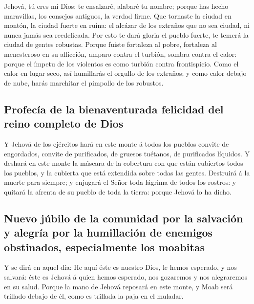  Jehová, tú eres mi Dios: te ensalzaré, alabaré tu nombre;
porque has hecho maravillas, los consejos antiguos, la verdad firme.
 Que tornaste la ciudad en montón, la ciudad fuerte en
ruina: el alcázar de los extraños que no sea ciudad, ni nunca jamás sea
reedeficada.  Por esto te dará gloria el pueblo fuerte, te
temerá la ciudad de gentes robustas.  Porque fuiste
fortaleza al pobre, fortaleza al menesteroso en su aflicción, amparo
contra el turbión, sombra contra el calor: porque el ímpetu de los
violentos es como turbión contra frontispicio.  Como el
calor en lugar seco, así humillarás el orgullo de los extraños; y como
calor debajo de nube, harás marchitar el pimpollo de los robustos.

\hypertarget{profecuxeda-de-la-bienaventurada-felicidad-del-reino-completo-de-dios}{%
\subsection{Profecía de la bienaventurada felicidad del reino completo
de
Dios}\label{profecuxeda-de-la-bienaventurada-felicidad-del-reino-completo-de-dios}}

 Y Jehová de los ejércitos hará en este monte á todos los
pueblos convite de engordados, convite de purificados, de gruesos
tuétanos, de purificados líquidos.  Y deshará en este
monte la máscara de la cobertura con que están cubiertos todos los
pueblos, y la cubierta que está extendida sobre todas las gentes.
 Destruirá á la muerte para siempre; y enjugará el Señor
toda lágrima de todos los rostros: y quitará la afrenta de su pueblo de
toda la tierra: porque Jehová lo ha dicho.

\hypertarget{nuevo-juxfabilo-de-la-comunidad-por-la-salvaciuxf3n-y-alegruxeda-por-la-humillaciuxf3n-de-enemigos-obstinados-especialmente-los-moabitas}{%
\subsection{Nuevo júbilo de la comunidad por la salvación y alegría por
la humillación de enemigos obstinados, especialmente los
moabitas}\label{nuevo-juxfabilo-de-la-comunidad-por-la-salvaciuxf3n-y-alegruxeda-por-la-humillaciuxf3n-de-enemigos-obstinados-especialmente-los-moabitas}}

 Y se dirá en aquel día: He aquí éste es nuestro Dios, le
hemos esperado, y nos salvará: éste es Jehová á quien hemos esperado,
nos gozaremos y nos alegraremos en su salud.  Porque la
mano de Jehová reposará en este monte, y Moab será trillado debajo de
él, como es trillada la paja en el muladar.

